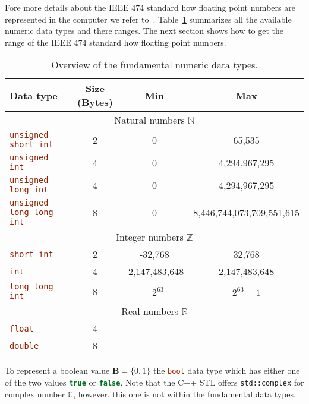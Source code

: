 Fore more details about the IEEE 474 standard how floating point numbers are represented in the computer we refer to~\cite{4610935,goldberg1991every}. Table~\ref{chapter2:table:datatypes} summarizes all the available numeric data types and there ranges. The next section shows how to get the range of the IEEE 474 standard how floating point numbers.

\begin{table}[h]
\centering
\begin{tabular}{lccc}
\toprule
Data type & Size (Bytes) & Min & Max \\\midrule
\multicolumn{4}{c}{Natural numbers $\mathbb{N}$ }\\\midrule
\lstinline[language=C++]|unsigned short int| & 2 & 0 & 65,535  \\ 
\lstinline[language=C++]|unsigned int| & 4 & 0 & 4,294,967,295 \\ 
\lstinline[language=C++]|unsigned long int| & 4 & 0 & 4,294,967,295 \\ 
\lstinline[language=C++]|unsigned long long int| & 8 & 0 & 8,446,744,073,709,551,615 \\ \midrule
\multicolumn{4}{c}{Integer numbers $\mathbb{Z}$ }\\\midrule
\lstinline[language=C++]|short int| & 2 & -32,768 & 32,768 \\
\lstinline[language=C++]|int| & 4 & -2,147,483,648 & 2,147,483,648 \\
\lstinline[language=C++]|long long int| & 8 & $-2^{63}$ & $2^{63}-1$ \\\midrule
\multicolumn{4}{c}{Real numbers $\mathbb{R}$ }\\\midrule
\lstinline[language=C++]|float| & 4 &  &  \\
\lstinline[language=C++]|double| & 8 &  &  \\
\bottomrule
\end{tabular} 
\caption{Overview of the fundamental numeric data types.}
\label{chapter2:table:datatypes}
\end{table}

To represent a boolean value $\mathbf{B}=\{0,1\}$ the \lstinline[language=C++]|bool| data type which has either one of the two values \lstinline[language=C++]|true| or \lstinline[language=C++]|false|. Note that the C++ STL offers \lstinline|std::complex| for complex number $\mathbb{C}$, however, this one is not within the fundamental data types.

